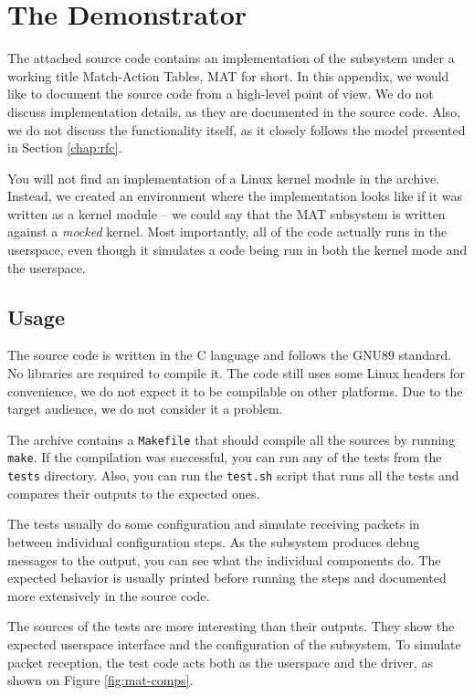 \chapter{The Demonstrator}
\label{app:doc}

The attached source code contains an implementation of the subsystem under
a working title Match-Action Tables, MAT for short. In this appendix, we would
like to document the source code from a high-level point of view. We do not
discuss implementation details, as they are documented in the source code.
Also, we do not discuss the functionality itself, as it closely follows the
model presented in Section \ref{chap:rfc}.

You will not find an implementation of a Linux kernel module in the archive.
Instead, we created an environment where the implementation looks like if it
was written as a kernel module -- we could say that the MAT subsystem is
written against a \emph{mocked} kernel. Most importantly, all of the code
actually runs in the userspace, even though it simulates a code being run in
both the kernel mode and the userspace.

\section{Usage}

The source code is written in the C language and follows the GNU89 standard.
No libraries are required to compile it. The code still uses some Linux
headers for convenience, we do not expect it to be compilable on other
platforms. Due to the target audience, we do not consider it a problem.

The archive contains a \texttt{Makefile} that should compile all the sources by
running \texttt{make}. If the compilation was successful, you can run any of
the tests from the \texttt{tests} directory. Also, you can run the
\texttt{test.sh} script that runs all the tests and compares their outputs to
the expected ones.

The tests usually do some configuration and simulate receiving packets in
between individual configuration steps. As the subsystem produces debug messages to the
output, you can see what the individual components do. The expected behavior is
usually printed before running the steps and documented more extensively in
the source code.

The sources of the tests are more interesting than their outputs. They show
the expected userspace interface and the configuration of the subsystem. To
simulate packet reception, the test code acts both as the userspace and the
 driver, as shown on Figure \ref{fig:mat-comps}.

